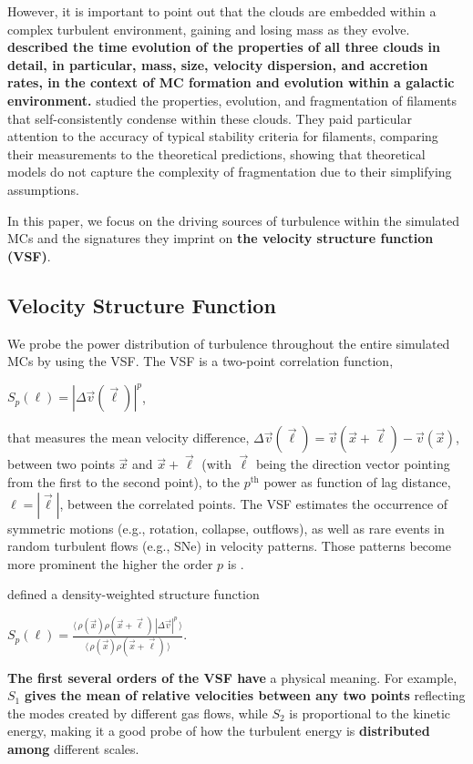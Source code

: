 However, it is important to point out that the clouds are embedded within a complex turbulent environment, gaining and losing mass as they evolve.
\textbf{ described the time evolution of the properties of all three clouds in detail, in particular, mass, size, velocity dispersion, and accretion rates, in the context of MC formation and evolution within a galactic environment.}
 studied the properties, evolution, and fragmentation of filaments that self-consistently condense within these clouds. 
They paid particular attention to the accuracy of typical stability criteria for filaments, comparing their measurements to the theoretical predictions, showing that theoretical models do not capture the complexity of fragmentation due to their simplifying assumptions.

In this paper, we focus on the driving sources of turbulence within the simulated MCs and the signatures they imprint on \textbf{the velocity structure function (VSF)}.


\subsection{Velocity Structure Function}\label{methods:vsf}

We probe the power distribution of turbulence throughout the entire simulated MCs by using the VSF.
The VSF is a two-point correlation function,
\begin{definition}
	${S}_p (\ell) = |\Delta \vec{v} (\vec{\ell})|^p$,
    \label{equ:method:def_vsf}
\end{definition}
that measures the mean velocity difference, $\Delta \vec{v} (\vec{\ell}) = \vec{v}(\vec{x}+\vec{\ell}) - \vec{v}(\vec{x})$, between two points $\vec{x}$ and $\vec{x}+\vec{\ell}$ (with $\vec{\ell}$ being the direction vector pointing from the first to the second point), to the $p^\mathrm{th}$ power as function of lag distance, $\ell = |\vec{\ell}|$, between the correlated points.
The VSF estimates the occurrence of symmetric motions (e.g., rotation, collapse, outflows), as well as rare events in random turbulent flows (e.g., SNe) in velocity patterns.
Those patterns become more prominent the higher the order $p$ is \citep{Heyer2004}.

\citet{Padoan2016a} defined a density-weighted structure function
\begin{definition}
	${S}_p (\ell) = \frac{\langle \, \rho(\vec{x}) \rho(\vec{x}+\vec{\ell}) \, |\Delta \vec{v}|^p  \, \rangle}{\langle  \, \rho(\vec{x}) \rho(\vec{x}+\vec{\ell}) \, \rangle}$.
    \label{equ:method:def_vsf_dw}
\end{definition}
\textbf{The first several orders of the VSF have} a physical meaning. 
For example, $\mathit{S}_1$ \textbf{ gives the mean of relative velocities between any two points} reflecting the modes created by different gas flows, while $\mathit{S}_2$ is proportional to the kinetic energy, making it a good probe of how the turbulent energy is \textbf{distributed among} different scales.

